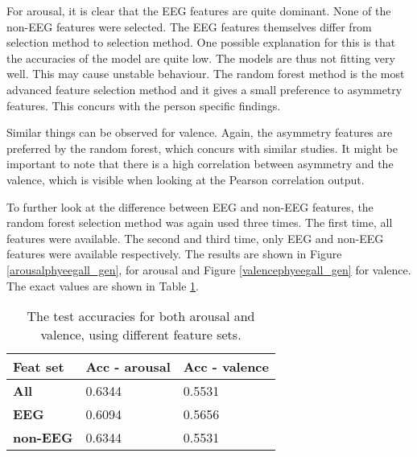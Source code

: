 \clearpage

For arousal, it is clear that the EEG features are quite dominant. None of the non-EEG features were selected. The EEG features themselves differ from selection method to selection method. One possible explanation for this is that the accuracies of the model are quite low. The models are thus not fitting very well. This may cause unstable behaviour. The random forest method is the most advanced feature selection method and it gives a small preference to asymmetry features. This concurs with the person specific findings.

\npar

Similar things can be observed for valence. Again, the asymmetry features are preferred by the random forest, which concurs with similar studies. It might be important to note that there is a high correlation between asymmetry and the valence, which is visible when looking at the Pearson correlation output.

\npar

To further look at the difference between EEG and non-EEG features, the random forest selection method was again used three times. The first time, all features were available. The second and third time, only EEG and non-EEG features were available respectively. The results are shown in Figure \ref{arousalphyeegall_gen}, for arousal and Figure \ref{valencephyeegall_gen} for valence. The exact values are shown in Table \ref{phyeegallgenTable}.




\begin{table}[H]
\centering
\caption{The test accuracies for both arousal and valence, using different feature sets.\label{phyeegallgenTable}}
\begin{tabular}{l|ll}
\textbf{Feat set}  & \textbf{Acc - arousal}       & \textbf{Acc - valence}          \\ \hline
\textbf{All}       & 0.6344           & 0.5531           \\
\textbf{EEG}       & 0.6094           & 0.5656           \\
\textbf{non-EEG}   & 0.6344           & 0.5531          
\end{tabular}
\end{table}

